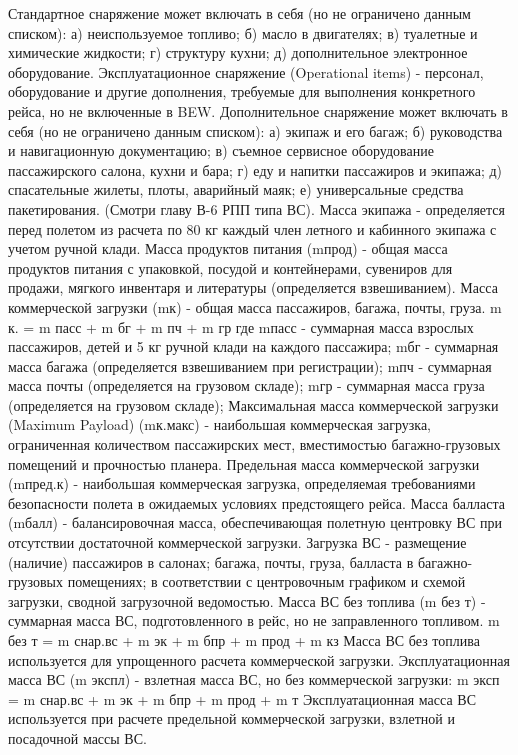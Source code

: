 Стандартное снаряжение может включать в себя (но не ограничено данным списком):
а)	неиспользуемое топливо;
б)	масло в двигателях;
в)	туалетные и химические жидкости;
г)	структуру кухни;
д)	дополнительное электронное оборудование.
Эксплуатационное снаряжение (Operational items) - персонал, оборудование и другие дополнения, требуемые для выполнения конкретного рейса, но не включенные в BEW.
Дополнительное снаряжение может включать в себя (но не ограничено данным списком):
а)	экипаж и его багаж;
б)	руководства и навигационную документацию;
в)	съемное сервисное оборудование пассажирского салона, кухни и бара;
г)	еду и напитки пассажиров и экипажа;
д)	спасательные жилеты, плоты, аварийный маяк;
е)	универсальные средства пакетирования.
(Смотри главу В-6 РПП типа ВС).
Масса экипажа - определяется перед полетом из расчета по 80 кг каждый член летного и кабинного экипажа с учетом ручной клади.
Масса продуктов питания (mпрод) - общая масса продуктов питания с упаковкой, посудой и контейнерами, сувениров для продажи, мягкого инвентаря и литературы (определяется взвешиванием).
Масса коммерческой загрузки (mк) - общая масса пассажиров, багажа, почты, груза.
m к. = m пасс + m бг + m пч + m гр
где mпасс - суммарная масса взрослых пассажиров, детей и 5 кг ручной клади на каждого пассажира;
mбг - суммарная масса багажа (определяется взвешиванием при регистрации);
mпч - суммарная масса почты (определяется на грузовом складе);
mгр - суммарная масса груза (определяется на грузовом складе);
Максимальная масса коммерческой загрузки (Maximum Payload) (mк.макс) - наибольшая коммерческая загрузка, ограниченная количеством пассажирских мест, вместимостью багажно-грузовых помещений и прочностью планера. 
Предельная масса коммерческой загрузки (mпред.к) - наибольшая коммерческая загрузка, определяемая требованиями безопасности полета в ожидаемых условиях предстоящего рейса.
Масса балласта (mбалл) - балансировочная масса, обеспечивающая полетную центровку ВС при отсутствии достаточной коммерческой загрузки.
Загрузка ВС - размещение (наличие) пассажиров в салонах; багажа, почты, груза, балласта в багажно-грузовых помещениях; в соответствии с центровочным графиком и схемой загрузки, сводной загрузочной ведомостью.
Масса ВС без топлива (m без т) - суммарная масса ВС, подготовленного в рейс, но не заправленного топливом.
m без т = m снар.вс + m эк + m бпр + m прод + m кз
Масса ВС без топлива используется для упрощенного расчета коммерческой загрузки.
Эксплуатационная масса ВС (m экспл) - взлетная масса ВС, но без коммерческой загрузки:
m эксп = m снар.вс + m эк + m бпр + m прод + m т
Эксплуатационная масса ВС используется при расчете предельной коммерческой загрузки, взлетной и посадочной массы ВС.
